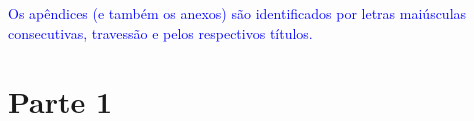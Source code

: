 \begin{center}
\label{ApendiceA}
\end{center}

\textcolor{Blue}{Os apêndices (e também os anexos) são identificados por letras maiúsculas consecutivas, travessão e pelos respectivos títulos.}\\

\section{Parte 1}\label{ApendiceA:1}

%



